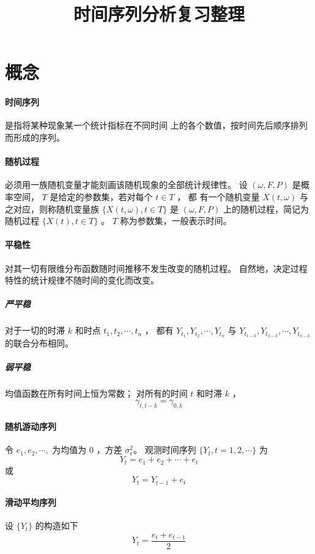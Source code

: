 \documentclass[UTF8,hyperref,a4paper,twoside]{ctexart}
\title{\textbf{时间序列分析复习整理}}
\author{\fangsong{胡奕公}}
\date{\kaishu{2018年9月22日}}
\begin{document}
        \maketitle

        \section{概念}

        \paragraph{时间序列} 是指将某种现象某一个统计指标在不同时间
        上的各个数值，按时间先后顺序排列而形成的序列。

        \paragraph{随机过程}必须用一族随机变量才能刻画该随机现象的全部统计规律性。 
        设 $ (ω, F, P) $ 是概率空间， $ T $ 是给定的参数集，若对每个 $ t ∈ T $ ，
        都 有一个随机变量  $ X(t,ω) $ 与之对应，则称随机变量族  $ \{ X(t,ω), t ∈ T \} $ 
        是 $ (ω, F, P) $ 上的随机过程，简记为随机过程 $ \{ X(t), t ∈ T \} $ 。
        $ T $ 称为参数集，一般表示时间。

        \paragraph{平稳性} 对其一切有限维分布函数随时间推移不发生改变的随机过程。
        自然地，决定过程特性的统计规律不随时间的变化而改变。

        \subparagraph{严平稳} 对于一切的时滞 $ k $ 和时点 $ t_1, t_2, ⋯, t_n $ ，
        都有 $ Y_{t_1}, Y_{t_2},  ⋯, Y_{t_n} $ 与
        $ Y_{t_{1−k}}, Y_{t_{2−k}}, ⋯, Y_{t_{n−k}}  $ 的联合分布相同。

        \subparagraph{弱平稳} 均值函数在所有时间上恒为常数；
        对所有的时间 $ t $ 和时滞  $ k $ ， $$ γ_{t,t-k} = γ_{0,k} $$

        \paragraph{随机游动序列} 令 $ e_1, e_2, ⋯,  $ 为均值为 $ 0 $ ，方差 $ σ_e^2 $。
        观测时间序列 $ \{ Y_t, t = 1,2,⋯ \} $ 为 $$ Y_t = e_1 + e_2 + ⋯ + e_t $$ 
        或 $$ Y_t = Y_{t-1} + e_t $$ 

        \paragraph{滑动平均序列} 设 $ \{Y_t\} $  的构造如下
        $$ Y_t = \frac{e_t + e_{t-1}}{2} $$ 
\end{document}
